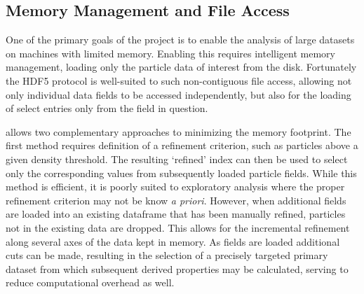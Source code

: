 \subsection{Memory Management and File Access}
\label{sec:fileIO}
One of the primary goals of the  project is to enable the analysis of large datasets on machines with limited memory.
Enabling this requires intelligent memory management, loading only the particle data of interest from the disk.
Fortunately the HDF5 protocol is well-suited to such non-contiguous file access, allowing not only individual data fields to be accessed independently, but also for the loading of select entries only from the field in question.

 allows two complementary approaches to minimizing the memory footprint.
The first method requires definition of a refinement criterion, such as particles above a given density threshold.
The resulting `refined' index can then be used to select only the corresponding values from subsequently loaded particle fields.
While this method is efficient, it is poorly suited to exploratory analysis where the proper refinement criterion may not be know {\it{a priori}}.
However, when additional fields are loaded into an existing  dataframe that has been manually refined, particles not in the existing data are dropped.
This allows for the incremental refinement along several axes of the data kept in memory.
As fields are loaded additional cuts can be made, resulting in the selection of a precisely targeted primary dataset from which subsequent derived properties may be calculated, serving to reduce computational overhead as well.